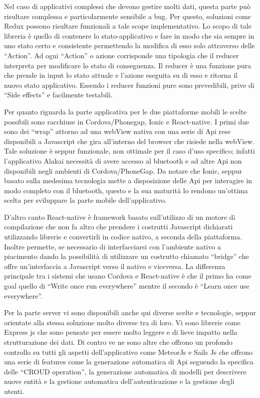 Nel caso di applicativi complessi che devono gestire molti dati, questa parte può risultare complessa e particolarmente sensibile a bug. Per questo, soluzioni come Redux possono risultare funzionali a tale scope implementativo. Lo scopo di tale libreria è quello di contenere lo stato-applicativo e fare in modo che sia sempre in uno stato certo e consistente permettendo la modifica di esso solo attraverso delle “Action”. Ad ogni “Action” o azione corrisponde una tipologia che il reducer interpreta per modificare lo stato di conseguenza. Il reducer è una funzione pura che prende in input lo stato attuale e l’azione eseguita su di esso e ritorna il nuovo stato applicativo. Essendo i reducer funzioni pure sono prevedibili, prive di “Side effects” e facilmente testabili.\vspace{5mm} 

Per quanto riguarda la parte applicativa per le due piattaforme mobili le scelte possibili sono racchiuse in Cordova/Phonegap, Ionic e React-native. I primi due sono dei “wrap” attorno ad una webView nativa con una serie di Api rese disponibili a Javascript che gira all’interno del browser che risiede nella webView. Tale soluzione è seppur funzionale, non ottimale per il caso d’uso specifico; infatti l’applicativo Alakai necessità di avere accesso al bluetooth e ad altre Api non disponibili negli ambienti di Cordova/PhoneGap. Da notare che Ionic, seppur basato sulla medesima tecnologia mette a disposizione delle Api per interagire in modo completo con il bluetooth, questo e la sua maturità lo rendono un'ottima scelta per sviluppare la parte mobile dell’applicativo.\vspace{5mm} 

D’altro canto React-native è framework basato sull’utilizzo di un motore di compilazione che non fa altro che prendere i costrutti Javascript dichiarati utilizzando librerie e convertirli in codice nativo, a seconda della piattaforma. Inoltre permette, se necessario di interfacciarsi con l’ambiente nativo a piacimento dando la possibilità di utilizzare un costrutto chiamato “bridge” che offre un’interfaccia a Javascript verso il nativo e viceversa. La differenza principale tra i sistemi che usano Cordova e React-native è che il primo ha come goal quello di “Write once run everywhere” mentre il secondo è “Learn once use everywhere”.\vspace{5mm}

Per la parte server vi sono disponibili anche qui diverse scelte e tecnologie, seppur orientate alla stessa soluzione molto diverse tra di loro. Vi sono librerie come Express js che sono pensate per essere molto leggere e di lieve impatto nella strutturazione dei dati. Di contro ve ne sono altre che offrono un profondo controllo su tutti gli aspetti dell’applicativo come MeteorJs e Sails Js che offrono una serie di features come la generazione automatica di Api seguendo la specifica delle “CROUD operation”, la generazione automatica di modelli per descrivere nuove entità e la gestione automatica dell’autenticazione e la gestione degli utenti.\vspace{5mm}

